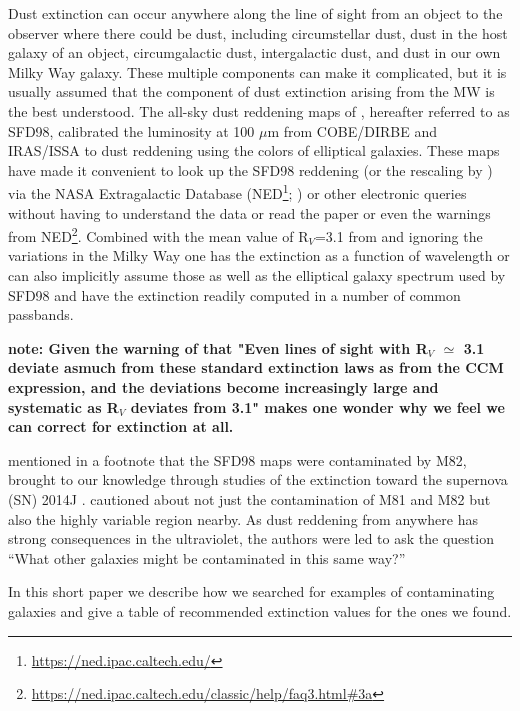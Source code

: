 \documentclass[twocolumn]{aastex61}
\begin{document}
Dust extinction can occur anywhere along the line of sight from an object to the observer where there could be dust, including circumstellar dust, dust in the host galaxy of an object, circumgalactic dust, intergalactic dust, and dust in our own Milky Way galaxy.  These multiple components can make it complicated, but it is usually assumed that the component of dust extinction arising from the MW is the best understood.  The all-sky dust reddening maps of \citet{Schlegel_etal_1998}, hereafter referred to as SFD98, calibrated the luminosity at 100 $\mu$m from COBE/DIRBE and IRAS/ISSA to dust reddening using the colors of elliptical galaxies.  These maps have made it convenient to look up the SFD98 reddening (or the rescaling by \citealp{Schlafly_Finkbeiner_2011}) via the NASA Extragalactic Database (NED\footnote{\url{https://ned.ipac.caltech.edu/}}; \citealp{Mazzarella_etal_2001}) or other electronic queries without having to understand the data or read the paper or even the warnings from NED\footnote{\url{https://ned.ipac.caltech.edu/classic/help/faq3.html\#3a}}.  Combined with the mean value of R$_V$=3.1 from \citet{Fitzpatrick_1999} and ignoring the variations in the Milky Way \citep{Clayton_Cardelli_1988} one has the extinction as a function of wavelength or can also implicitly assume those as well as the elliptical galaxy spectrum used by SFD98 and have the extinction readily computed in a number of common passbands.

{\bf note: Given the warning of \citealp{Cardelli_etal_1989} that "Even lines of sight with R$_V$ $\simeq$ 3.1 deviate asmuch from these standard extinction laws as from the CCM
expression, and the deviations become increasingly large and
systematic as R$_V$ deviates from 3.1" makes one wonder why we feel we can correct for extinction at all.  }

\citet{Dalcanton_etal_2009} mentioned in a footnote that the SFD98 maps were contaminated by M82, brought to our knowledge through studies of the extinction toward the supernova (SN) 2014J \citep{Foley_etal_2014J}.  \citet{Johnson_etal_2009} cautioned about not just the contamination of M81 and M82 but also the highly variable region nearby.  As dust reddening from anywhere has strong consequences in the ultraviolet, the authors were led to ask the question ``What other galaxies might be contaminated in this same way?''

In this short paper we describe how we searched for examples of contaminating galaxies and give a table of recommended extinction values for the ones we found.  
\end{document}
